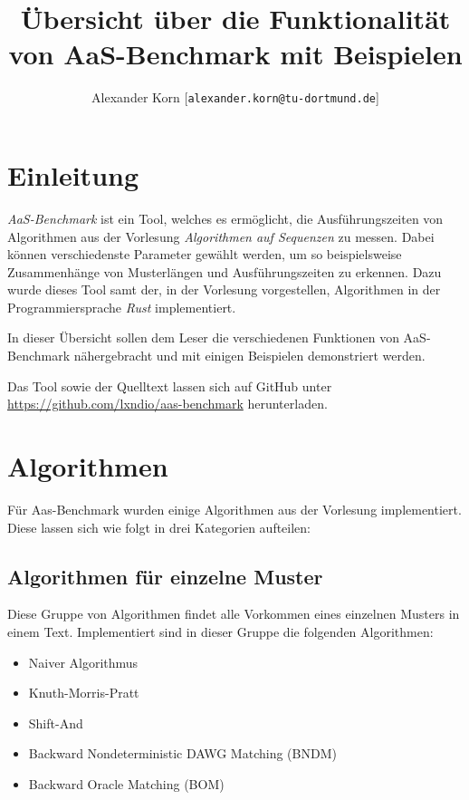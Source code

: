 \documentclass[twocolumn]{article}
\title{\Large \textbf{Übersicht über die Funktionalität von AaS-Benchmark mit Beispielen}}
\author{Alexander Korn [\texttt{alexander.korn@tu-dortmund.de}]}
\date{}
\begin{document}
\maketitle

\section{Einleitung}

\textit{AaS-Benchmark} ist ein Tool, welches es ermöglicht, die Ausführungszeiten von Algorithmen aus der Vorlesung \textit{Algorithmen auf Sequenzen} zu messen. Dabei können verschiedenste Parameter gewählt werden, um so beispielsweise Zusammenhänge von Musterlängen und Ausführungszeiten zu erkennen. Dazu wurde dieses Tool samt der, in der Vorlesung vorgestellen, Algorithmen in der Programmiersprache \textit{Rust} implementiert.

In dieser Übersicht sollen dem Leser die verschiedenen Funktionen von AaS-Benchmark nähergebracht und mit einigen Beispielen demonstriert werden.

Das Tool sowie der Quelltext lassen sich auf GitHub unter \url{https://github.com/lxndio/aas-benchmark} herunterladen.

\section{Algorithmen}

Für Aas-Benchmark wurden einige Algorithmen aus der Vorlesung implementiert. Diese lassen sich wie folgt in drei Kategorien aufteilen:

\subsection{Algorithmen für einzelne Muster}

Diese Gruppe von Algorithmen findet alle Vorkommen eines einzelnen Musters in einem Text. Implementiert sind in dieser Gruppe die folgenden Algorithmen:

\begin{itemize}
    \setlength\itemsep{0em}
    \item Naiver Algorithmus
    \item Knuth-Morris-Pratt
    \item Shift-And
    \item Backward Nondeterministic DAWG Matching (BNDM)
    \item Backward Oracle Matching (BOM)
\end{itemize}
\end{document}
